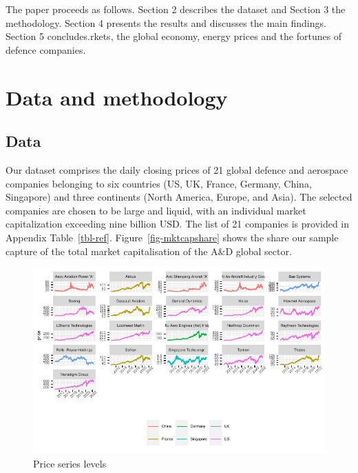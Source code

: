\documentclass[
  letterpaper,
  DIV=11,
  numbers=noendperiod]{scrartcl}
\begin{document}
The paper proceeds as follows. Section 2 describes the dataset and
Section 3 the methodology. Section 4 presents the results and discusses
the main findings. Section 5 concludes.rkets, the global economy, energy
prices and the fortunes of defence companies.

\hypertarget{data-and-methodology}{%
\section{Data and methodology}\label{data-and-methodology}}

\hypertarget{data}{%
\subsection{Data}\label{data}}

Our dataset comprises the daily closing prices of 21 global defence and
aerospace companies belonging to six countries (US, UK, France, Germany,
China, Singapore) and three continents (North America, Europe, and
Asia). The selected companies are chosen to be large and liquid, with an
individual market capitalization exceeding nine billion USD. The list of
21 companies is provided in Appendix Table~\ref{tbl-ref}.
Figure~\ref{fig-mktcapshare} shows the share our sample capture of the
total market capitalisation of the A\&D global sector.

\begin{figure}[H]

{\centering \includegraphics{defence_files/figure-pdf/fig-prices-1.pdf}

}

\caption{\label{fig-prices}Price series levels}

\end{figure}
\end{document}
